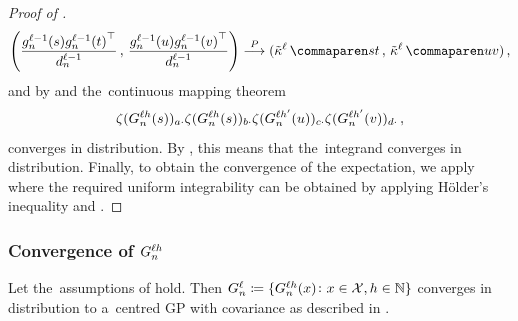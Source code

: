 \begin{proof}[Proof of ]
\begin{equation*}
            \left(
                \frac{
                    \indexedActivity{\depthSymbol - 1}{\sequenceVariable}{s}
                    \indexedActivity{\depthSymbol - 1}{\sequenceVariable}{t}^\top
                }{
                    \layerDimension{\depthSymbol - 1}
                }
                \, , \,
            \frac{
                \indexedActivity{\depthSymbol - 1}{\sequenceVariable}{u}
                \indexedActivity{\depthSymbol - 1}{\sequenceVariable}{v}^\top
            }{
                \layerDimension{\depthSymbol - 1}
            }
            \right)
            \convergeProb
            (
                \kerntildef{}{\depthSymbol}{s}{t}
                \, , \,
                \kerntildef{}{\depthSymbol}{u}{v}
            )
            \, ,
    \end{equation*}
    and by  and the~continuous mapping theorem 
    $$ \zeta(G_{n}^{\ell h} (s))_{a \cdot} \zeta(G_{n}^{\ell h} (s))_{b \cdot} \zeta(G_{n}^{\ell h'} (u))_{c \cdot} \zeta(G_{n}^{\ell h'} (v))_{d \cdot}  \, ,$$
    converges in distribution.
    By , this means that the~integrand converges in distribution.
    Finally, to obtain the convergence of the expectation, we apply  where the required uniform integrability can be obtained by applying H{\" o}lder's inequality and .
\end{proof}






\subsubsection{Convergence of $G_{n}^{\ell h}$}

\begin{lemma}\label{lem:logit_dist_convergence}
    Let the~assumptions of  hold.
    Then 
    $G_{n}^{\ell} \coloneqq \{ G_{n}^{\ell h}(x) \colon x \in \mathcal{X} , h \in \mathbb{N} \}$  %
    converges in distribution to a~centred GP with covariance as described in .
\end{lemma}


